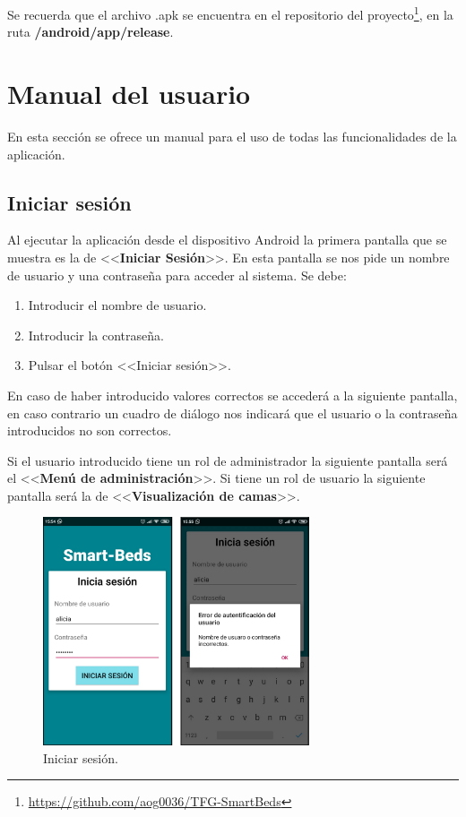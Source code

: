 Se recuerda que el archivo .apk se encuentra en el repositorio del proyecto\footnote{\url{https://github.com/aog0036/TFG-SmartBeds}}, en la ruta \textbf{/android/app/release}.

\section{Manual del usuario}

En esta sección se ofrece un manual para el uso de todas las funcionalidades de la aplicación. 

\subsection{Iniciar sesión}

Al ejecutar la aplicación desde el dispositivo Android la primera pantalla que se muestra es la de <<\textbf{Iniciar Sesión}>>. En esta pantalla se nos pide un nombre de usuario y una contraseña para acceder al sistema. Se debe: 

\begin{enumerate}
	\item Introducir el nombre de usuario. 
	\item Introducir la contraseña. 
	\item Pulsar el botón <<Iniciar sesión>>. 
\end{enumerate}

En caso de haber introducido valores correctos se accederá a la siguiente pantalla, en caso contrario un cuadro de diálogo nos indicará que el usuario o la contraseña introducidos no son correctos. 

Si el usuario introducido tiene un rol de administrador la siguiente pantalla será el <<\textbf{Menú de administración}>>. Si tiene un rol de usuario la siguiente pantalla será la de <<\textbf{Visualización de camas}>>. 

\begin{figure}[H]
	\centering
	\includegraphics[width=0.7\textwidth]{../img/iniciasesion.png}
	\caption{Iniciar sesión.}
	\label{fig:iniciasesion}
\end{figure}

